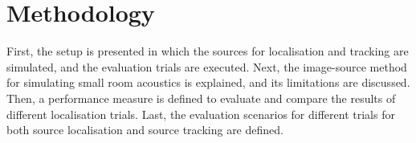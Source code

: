 \section{Methodology}
\label{chap:methodology}

First, the setup is presented in which the sources for localisation and tracking are simulated, and the evaluation trials are executed. Next, the image-source method for simulating small room acoustics is explained, and its limitations are discussed. Then, a performance measure is defined to evaluate and compare the results of different localisation trials. Last, the evaluation scenarios for different trials for both source localisation and source tracking are defined.